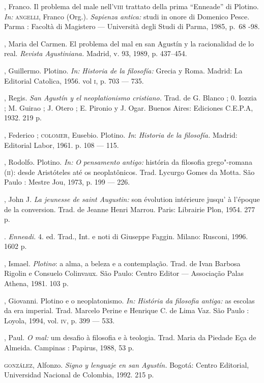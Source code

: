 \begin{description}
 , Franco. Il problema del male nell'\textsc{viii} trattato della
prima ``Enneade'' di Plotino. \emph{In:} \textsc{angelli}, Franco (Org.).
\emph{Sapienza antica:} studi in onore di Domenico
Pesce. Parma : Facoltà di Magistero --- Università degli Studi di
Parma, 1985, p.~68 -98.

 , Maria del Carmen. El
problema del mal en san Agustín y la racionalidad de lo real.
\emph{Revista Agustiniana}\emph{.} Madrid, v. 93, 1989, p.
437--454.

 , Guillermo. Plotino. \emph{In:}
\emph{Historia de la filosofía}\emph{:} Grecia y Roma. 
Madrid: La Editorial Catolica, 1956. vol \textsc{i}, p. 703 --- 735. 


, Regis.  \emph{San Agustín y el neoplationismo
cristiano}\emph{.} Trad. de G. Blanco ; 0. Iozzia ; M. Guirao
; J. Otero ; E. Pironio y J. Ogar. Buenos Aires: Ediciones
C.E.P.A, 1932. 219 p.

 , Federico ; \textsc{colomer}, Eusebio.
Plotino. \emph{In}: \emph{Historia  de la
filosofía}\emph{.} Madrid: Editorial  Labor, 1961. p. 108 ---
115.

 , Rodolfo. Plotino. \emph{In:} \emph{O
pensamento antigo:} história da filosofia grego"-romana
(\textsc{ii}): desde Aristóteles até os neoplatônicos. Trad. Lycurgo
Gomes da Motta. São Paulo : Mestre Jou, 1973, p. 199 --- 226. 


, John J. \emph{La jeunesse de saint Augustin}\emph{:}
son évolution intérieure jusqu' à l'époque de la conversion.
Trad. de Jeanne Henri Marrou. Paris: Librairie Plon, 1954. 277
p.

 . \emph{Enneadi}\emph{.} 4. ed. Trad., Int. e
noti di Giuseppe Faggin. Milano: Rusconi, 1996. 1602 p.


, Ismael. \emph{Plotino}: a alma, a beleza e a
contemplação. Trad. de Ivan Barbosa Rigolin e Consuelo
Colinvaux. São Paulo: Centro Editor --- Associação Palas Athena,
1981. 103 p.

 , Giovanni. Plotino e o neoplatonismo.
\emph{In:} \emph{História da filosofia antiga:} as
escolas da era imperial. Trad. Marcelo Perine e Henrique C. de
Lima Vaz. São Paulo : Loyola, 1994, vol. \textsc{iv}, p. 399 --- 533.


, Paul. \emph{O mal:} um desafio à filosofia e
à teologia. Trad. Maria da Piedade Eça de Almeida. Campinas :
Papirus, 1988, 53 p. 

  \textsc{gonzález}, Alfonzo. \emph{Signo
y lenguaje en san Agustín}\emph{.} Bogotá: Centro Editorial,
Universidad Nacional de Colombia, 1992. 215 p. 


\end{description}
